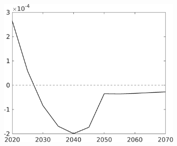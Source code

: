 \begin{figure}[h!!!]
\begin{subfigure}{0.4\textwidth}
	\includegraphics[width=1\textwidth]{../../codding_model/own_basedOnFried/optimalPol_010922_revision/figures/all_13Sept22_Tplus30/SWF_OPT_T_NoTaus_COMPtaulPer_regime4_spillover0_knspil0_noskill0_sep0_xgrowth0_PV1_etaa0.79.png}
	\end{subfigure}


\end{figure}
